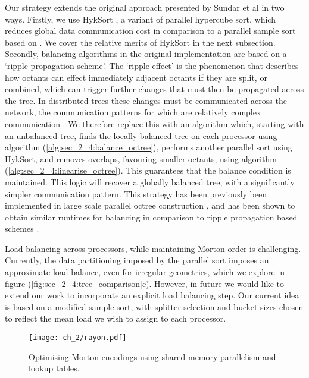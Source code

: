 Our strategy extends the original approach presented by Sundar et al in two ways. Firstly, we use HykSort \cite{sundar2013hyksort}, a variant of parallel hypercube sort, which reduces global data communication cost in comparison to a parallel sample sort based on . We cover the relative merits of HykSort in the next subsection. Secondly, balancing algorithms in the original implementation are based on a `ripple propagation scheme'. The `ripple effect' is the phenomenon that describes how octants can effect immediately adjacent octants if they are split, or combined, which can trigger further changes that must then be propagated across the tree. In distributed trees these changes must be communicated across the network, the communication patterns for which are relatively complex communication \cite{tu2005scalable,sundar2008bottom}. We therefore replace this with an algorithm which, starting with an unbalanced tree, finds the locally balanced tree on each processor using algorithm (\ref{alg:sec_2_4:balance_octree}), performs another parallel sort using HykSort, and removes overlaps, favouring smaller octants, using algorithm (\ref{alg:sec_2_4:linearise_octree}). This guarantees that the balance condition is maintained. This logic will recover a globally balanced tree, with a significantly simpler communication pattern. This strategy has been previously been implemented in large scale parallel octree construction \cite{malhotra2015pvfmm}, and has been shown to obtain similar runtimes for balancing in comparison to ripple propagation based schemes \cite{suh2020evaluation}.

Load balancing across processors, while maintaining Morton order is challenging. Currently, the data partitioning imposed by the parallel sort imposes an approximate load balance, even for irregular geometries, which we explore in figure (\ref{fig:sec_2_4:tree_comparison}c). However, in future we would like to extend our work to incorporate an explicit load balancing step. Our current idea is based on a modified sample sort, with splitter selection and bucket sizes chosen to reflect the mean load we wish to assign to each processor.

\begin{figure}
    \centerline{\texttt{[image: ch\_2/rayon.pdf]}}
    \caption{Optimising Morton encodings using shared memory parallelism and lookup tables.}
    \label{fig:sec_2_4:rayon}
\end{figure}

